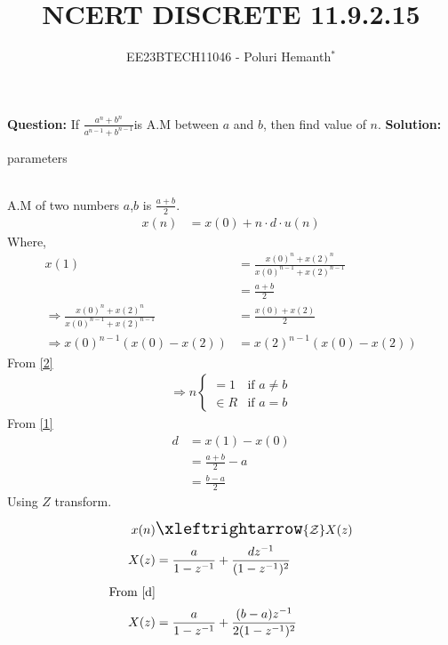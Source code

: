 \documentclass[journal,12pt,twocolumn]{IEEEtran}
\theoremstyle{remark}
\begin{document}

\vspace{3cm}


\title{NCERT DISCRETE 11.9.2.15}
\author{EE23BTECH11046 - Poluri Hemanth$^{*}$}
\maketitle
\textbf{Question:}
If \( \frac{a^n +b^n}{a^{n-1} + b^{n-1}}\)is A.M between $a$ and $b$, then find value of $n$.
\break
\textbf{Solution:}
\fi
\begin{table}[h!]
        
        \caption{parameters}
\end{table}
\\A.M of two numbers $a$,$b$ is $\frac{a+b}{2}$.
\begin{align}
	x(n)&=x(0)+n\cdot d\cdot u(n)\label{1}
\end{align}
Where,
\begin{align}
	x(1)&=\frac{x(0)^n +x(2)^n}{x(0)^{n-1} + x(2)^{n-1}}\label{r}\\ 
	&=\frac{a+b}{2}\\
	\Rightarrow\frac{x(0)^n +x(2)^n}{x(0)^{n-1} + x(2)^{n-1}}&= \frac{x(0)+x(2)}{2}  \\
    \Rightarrow x(0)^{n-1}(x(0)-x(2))&=x(2)^{n-1}(x(0)-x(2))\label{2}
\end{align}
From \eqref{2}
\begin{align}
        \Rightarrow n
        \begin{cases}
                =1  &\text{if } a\neq b\\
                \in R &\text{if } a=b
        \end{cases}
\end{align}
From \eqref{1}\\
\begin{align}
	d&=x(1)-x(0)\\
	&=\frac{a+b}{2}-a\\
	&=\frac{b-a}{2}\label{d}
\end{align}
Using $Z$ transform.
\begin{align}
	x(n)&\Large\xleftrightarrow{\mathcal{Z}}X(z)\\
	X(z)&=\frac{a}{1-z^{-1}}+\frac{dz^{-1}}{(1-z^{-1})^2}\label{8}\\
	\notag\text{From \eqref{d}}\\
	X(z)&=\frac{a}{1-z^{-1}}+\frac{(b-a)z^{-1}}{2(1-z^{-1})^2}
\end{align}

\end{document}
